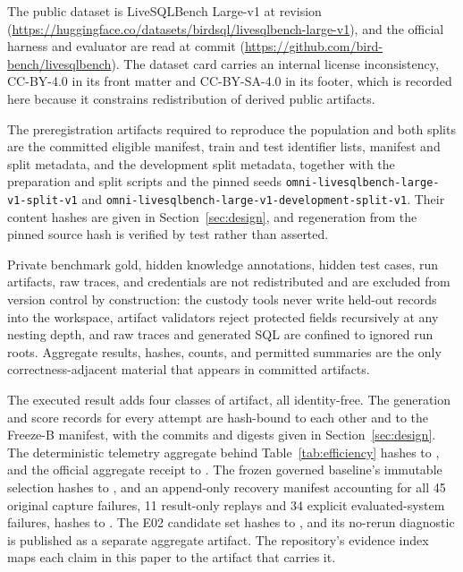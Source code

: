 \label{sec:materials}
The public dataset is LiveSQLBench Large-v1 at revision
(\url{https://huggingface.co/datasets/birdsql/livesqlbench-large-v1}), and the
official harness and evaluator are read at commit
(\url{https://github.com/bird-bench/livesqlbench}). The dataset card carries an
internal license inconsistency, CC-BY-4.0 in its front matter and CC-BY-SA-4.0 in
its footer, which is recorded here because it constrains redistribution of
derived public artifacts.

The preregistration artifacts required to reproduce the population and both
splits are the committed eligible manifest, train and test identifier lists,
manifest and split metadata, and the development split metadata, together with
the preparation and split scripts and the pinned seeds
\texttt{omni-livesqlbench-large-v1-split-v1} and
\texttt{omni-livesqlbench-large-v1-development-split-v1}. Their content hashes are
given in Section~\ref{sec:design}, and regeneration from the pinned source hash
is verified by test rather than asserted.

Private benchmark gold, hidden knowledge annotations, hidden test cases, run
artifacts, raw traces, and credentials are not redistributed and are excluded
from version control by construction: the custody tools never write held-out
records into the workspace, artifact validators reject protected fields
recursively at any nesting depth, and raw traces and generated SQL are confined
to ignored run roots. Aggregate results, hashes, counts, and permitted summaries
are the only correctness-adjacent material that appears in committed artifacts.

The executed result adds four classes of artifact, all identity-free. The
generation and score records for every attempt are hash-bound to each other and
to the Freeze-B manifest, with the commits and digests given in
Section~\ref{sec:design}. The deterministic telemetry aggregate behind
Table~\ref{tab:efficiency} hashes to
, and the
official aggregate receipt to
. The
frozen governed baseline's immutable selection hashes to
, and an
append-only recovery manifest accounting for all 45 original capture failures, 11
result-only replays and 34 explicit evaluated-system failures, hashes to
. The E02
candidate set hashes to
, and its
no-rerun diagnostic is published as a separate aggregate artifact. The
repository's evidence index maps each claim in this paper to the artifact that
carries it.


